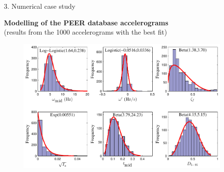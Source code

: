 \documentclass[10pt,xcolor = dvipsnames]{beamer}
\begin{document}
\begin{frame}[t]{3. Numerical case study}

{\small {\bf Modelling of the PEER database accelerograms} \\ \footnotesize (results from the 1000 accelerograms with the best fit)}

\begin{figure}
{\includegraphics[width=0.95\textwidth]{histfit.pdf}}
\end{figure}

\end{frame}
\end{document}
